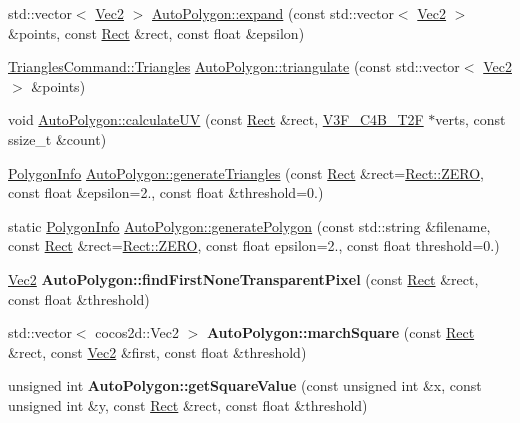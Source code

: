 \begin{DoxyCompactItemize}
std\+::vector$<$ \hyperlink{classVec2}{Vec2} $>$ \hyperlink{group____2d_ga13908bb1049ebcda0cdc63c7d6959ae6}{Auto\+Polygon\+::expand} (const std\+::vector$<$ \hyperlink{classVec2}{Vec2} $>$ \&points, const \hyperlink{classRect}{Rect} \&rect, const float \&epsilon)
\item 
\hyperlink{structTrianglesCommand_1_1Triangles}{Triangles\+Command\+::\+Triangles} \hyperlink{group____2d_ga0ee3e7e22fdf9982ec084191928caffa}{Auto\+Polygon\+::triangulate} (const std\+::vector$<$ \hyperlink{classVec2}{Vec2} $>$ \&points)
\item 
void \hyperlink{group____2d_gab4db69f4d34a6f61c4a71590043056da}{Auto\+Polygon\+::calculate\+UV} (const \hyperlink{classRect}{Rect} \&rect, \hyperlink{structV3F__C4B__T2F}{V3\+F\+\_\+\+C4\+B\+\_\+\+T2F} $\ast$verts, const ssize\+\_\+t \&count)
\item 
\hyperlink{classPolygonInfo}{Polygon\+Info} \hyperlink{group____2d_gad8b3406e33de529b8aa6571a87f3c2b9}{Auto\+Polygon\+::generate\+Triangles} (const \hyperlink{classRect}{Rect} \&rect=\hyperlink{classRect_a590be46e60027b2ca0f62a457f91a83e}{Rect\+::\+Z\+E\+RO}, const float \&epsilon=2., const float \&threshold=0.)
\item 
static \hyperlink{classPolygonInfo}{Polygon\+Info} \hyperlink{group____2d_ga666950d66e9c86bab409f01b0daeb831}{Auto\+Polygon\+::generate\+Polygon} (const std\+::string \&filename, const \hyperlink{classRect}{Rect} \&rect=\hyperlink{classRect_a590be46e60027b2ca0f62a457f91a83e}{Rect\+::\+Z\+E\+RO}, const float epsilon=2., const float threshold=0.)
\item 
\mbox{\label{group____2d_ga646417030e8ba4e685e625c11e55fd99}} 
\hyperlink{classVec2}{Vec2} {\bfseries Auto\+Polygon\+::find\+First\+None\+Transparent\+Pixel} (const \hyperlink{classRect}{Rect} \&rect, const float \&threshold)
\item 
\mbox{\label{group____2d_gad54339716cf8f7d214a78579c898ab88}} 
std\+::vector$<$ cocos2d\+::\+Vec2 $>$ {\bfseries Auto\+Polygon\+::march\+Square} (const \hyperlink{classRect}{Rect} \&rect, const \hyperlink{classVec2}{Vec2} \&first, const float \&threshold)
\item 
\mbox{\label{group____2d_gabd213ffc2f00a5c3d09ba261eee7a304}} 
unsigned int {\bfseries Auto\+Polygon\+::get\+Square\+Value} (const unsigned int \&x, const unsigned int \&y, const \hyperlink{classRect}{Rect} \&rect, const float \&threshold)

\end{DoxyCompactItemize}
